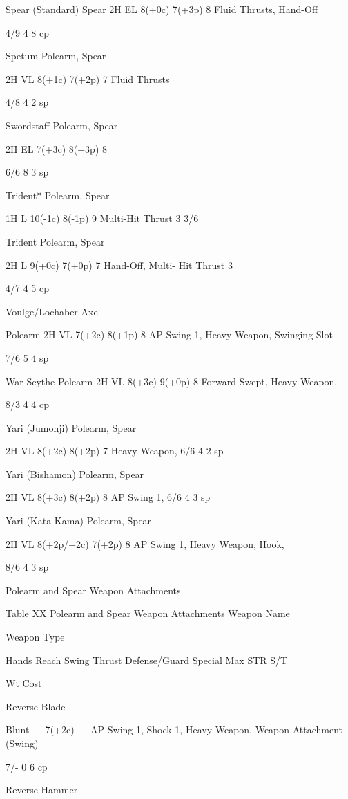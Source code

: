 \documentclass[oneside,11pt,english]{book}
\begin{document}
Spear (Standard) Spear 2H EL 8(+0c) 7(+3p) 8 Fluid Thrusts, 
Hand-Off 

4/9 4 8 cp 

Spetum Polearm, 
Spear 

2H VL 8(+1c) 7(+2p) 7 Fluid Thrusts 

 

4/8 4 2 sp 

Swordstaff Polearm, 
Spear 

2H EL 7(+3c) 8(+3p) 8 

 

6/6 8 3 sp 

Trident* Polearm, 
Spear 

1H L 10(-1c) 8(-1p) 9 Multi-Hit Thrust 3 3/6 

Trident Polearm, 
Spear 

2H L 9(+0c) 7(+0p) 7 Hand-Off, Multi-
Hit Thrust 3 

4/7 4 5 cp 

Voulge/Lochaber 
Axe 

Polearm 2H VL 7(+2c) 8(+1p) 8 AP Swing 1, 
Heavy Weapon, 
Swinging Slot 

7/6 5 4 sp 

War-Scythe Polearm 2H VL 8(+3c) 9(+0p) 8 Forward Swept, 
Heavy Weapon, 

8/3 4 4 cp 

Yari (Jumonji) Polearm, 
Spear 

2H VL 8(+2c) 8(+2p) 7 Heavy Weapon, 6/6 4 2 sp 

Yari (Bishamon) Polearm, 
Spear 

2H VL 8(+3c) 8(+2p) 8 AP Swing 1, 6/6 4 3 sp 

Yari (Kata Kama) Polearm, 
Spear 

2H VL 8(+2p/+2c) 7(+2p) 8 AP Swing 1, 
Heavy Weapon, 
Hook, 

8/6 4 3 sp 

 
Polearm and Spear Weapon Attachments 

 
Table XX Polearm and Spear Weapon Attachments 
Weapon 
Name 

Weapon 
Type 

Hands Reach Swing Thrust Defense/Guard Special Max 
STR 
S/T 

Wt Cost 

Reverse 
Blade 

Blunt - - 7(+2c) - - AP Swing 1, Shock 1, Heavy 
Weapon, Weapon Attachment 
(Swing) 

7/- 0 6 cp 

Reverse 
Hammer 
\end{document}
